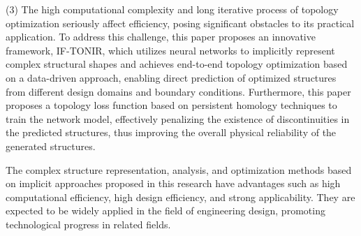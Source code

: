 \begin{abstract*}
(3) The high computational complexity and long iterative process of topology optimization seriously affect efficiency, posing significant obstacles to its practical application. To address this challenge, this paper proposes an innovative framework, IF-TONIR, which utilizes neural networks to implicitly represent complex structural shapes and achieves end-to-end topology optimization based on a data-driven approach, enabling direct prediction of optimized structures from different design domains and boundary conditions. Furthermore, this paper proposes a topology loss function based on persistent homology techniques to train the network model, effectively penalizing the existence of discontinuities in the predicted structures, thus improving the overall physical reliability of the generated structures.

The complex structure representation, analysis, and optimization methods based on implicit approaches proposed in this research have advantages such as high computational efficiency, high design efficiency, and strong applicability. They are expected to be widely applied in the field of engineering design, promoting technological progress in related fields.

\end{abstract*}
